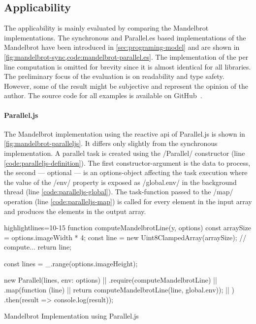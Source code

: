 \subsection{Applicability}
The applicability is mainly evaluated by comparing the Mandelbrot implementations. The synchronous and Parallel.es based implementations of the Mandelbrot have been introduced in \cref{sec:programing-model} and are shown in \cref{fig:mandelbrot-sync,code:mandelbrot-parallel.es}. The implementation of the per line computation is omitted for brevity since it is almost identical for all libraries. The preliminary focus of the evaluation is on readability and type safety. However, some of the result might be subjective and represent the opinion of the author. The source code for all examples is available on GitHub~\cite{Reiser2016}. 

\paragraph{Parallel.js}
The Mandelbrot implementation using the reactive api of Parallel.js is shown in \cref{fig:mandelbrot-paralleljs}. It differs only slightly from the synchronous implementation. A parallel task is created using the \javascriptinline/Parallel/ constructor (line \ref{code:paralleljs-definition}). The first constructor-argument is the data to process, the second --- optional ---  is an options-object affecting the task execution where the value of the \javascriptinline/env/ property is exposed as \javascriptinline/global.env/ in the background thread (line \ref{code:paralleljs-global}). The task-function passed to the \javascriptinline/map/ operation (line \ref{code:paralleljs-map}) is called for every element in the input array and produces the elements in the output array.

\begin{listing}
	\begin{javascriptcode*}{highlightlines={10-15}}
function computeMandelbrotLine(y, options) {
	const arraySize = options.imageWidth * 4;
	const line = new Uint8ClampedArray(arraySize);
	// compute...
	return line;
}

const lines = _.range(options.imageHeight);

new Parallel(lines, {env: options}) |$\label{code:paralleljs-definition}$|
	.require(computeMandelbrotLine)  |$\label{code:paralleljs-require}$|
	.map(function (line) { |$\label{code:paralleljs-map}$|
		return computeMandelbrotLine(line, global.env)); |$\label{code:paralleljs-global}$|
	})
	.then(result => console.log(result));
\end{javascriptcode*}

\caption{Mandelbrot Implementation using Parallel.js}
\label{fig:mandelbrot-paralleljs}
\end{listing}


